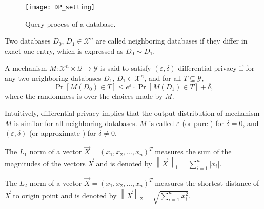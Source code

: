 \begin{figure}[htbp]
    \texttt{[image: DP\_setting]}
    \centering
    \caption{Query process of a database.}
    \label{img:DPsetting}
\end{figure}
\FloatBarrier

\begin{definition}
    Two databases $D_{0}$, $D_{1}\in \mathcal{X}^{n}$  are called neighboring databases if they differ in exact one entry, which is expressed as $D_{0}\sim D_{1}$.
    \label{def:NeighboringDatabases}
\end{definition}

\begin{definition}
    A mechanism $M:\mathcal{X}^{n}\times \mathcal{Q}\rightarrow \mathcal{Y}$ is said to satisfy $\left( \varepsilon ,\delta \right)$-differential privacy if for any two neighboring databases $D_{1}$, $D_{1}\in \mathcal{X}^{n}$, and for all $T\subseteq \mathcal{Y}$,
    \[\Pr \left[ M\left( D_{0}\right) \in T\right] \leq e^{\varepsilon}\cdot \Pr \left[ M\left( D_{1}\right) \in T\right] +\delta,\]
    where the randomness is over the choices made by $M$.
    \label{def:DP}
\end{definition}
Intuitively, differential privacy implies that the output distribution of mechanism $M$ is similar for all neighboring databases. $M$ is called $\varepsilon$-\differentialprivacy (or pure \differentialprivacy) for $\delta = 0$, and $\left(\varepsilon,\delta\right)$-\differentialprivacy (or approximate \differentialprivacy) for $\delta \neq 0$.

\begin{definition}[$L_{1}$ Norm]
    The $L_{1}$ norm of a vector $\vec{X}=\left(x_1, x_2, \ldots,x_n \right)^{T}$ measures the sum of the magnitudes of the vectors $\vec{X}$ and is denoted by $\left\|\vec{X}\right\|_{1}=\sum ^{n}_{i=1}\left| x_{i}\right| $.
\end{definition}

\begin{definition}[$L_{2}$ Norm]
    The $L_{2}$ norm of a vector $\vec{X}=\left(x_1, x_2, \ldots,x_n \right)^{T}$ measures the shortest distance of $\vec{X}$ to origin point and is denoted by $\left\|\vec{X}\right\|_{2}=\sqrt{\sum ^{n}_{i=1}x_{i}^{2}}$.
\end{definition}

